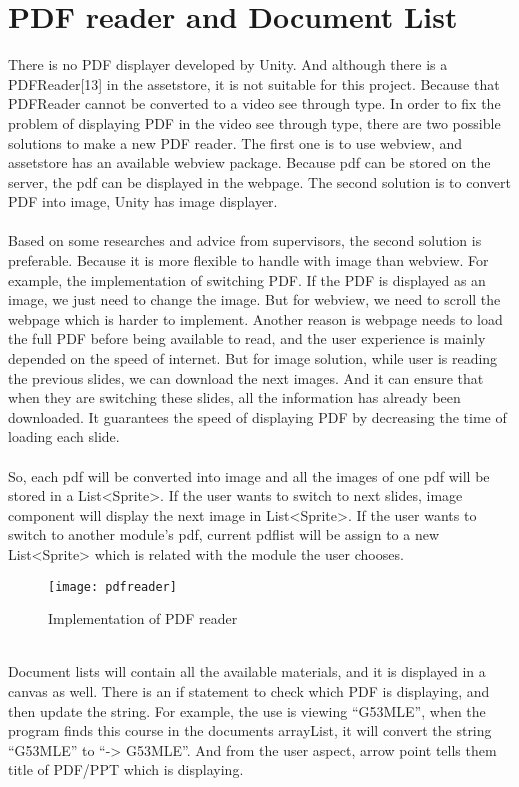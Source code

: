 \section{PDF reader and Document List}
There is no PDF displayer developed by Unity. And although there is a PDFReader[13] in the assetstore, it is not suitable for this project. Because that PDFReader cannot be converted to a video see through type. In order to fix the problem of displaying PDF in the video see through type, there are two possible solutions to make a new PDF reader. The first one is to use webview, and assetstore has an available webview package. Because pdf can be stored on the server, the pdf can be displayed in the webpage. The second solution is to convert PDF into image, Unity has image displayer. 
\\
\\
Based on some researches and advice from supervisors, the second solution is preferable. Because it is more flexible to handle with image than webview. For example, the implementation of switching PDF. If the PDF is displayed as an image, we just need to change the image. But for webview, we need to scroll the webpage which is harder to implement. Another reason is webpage needs to load the full PDF before being available to read, and the user experience is mainly depended on the speed of internet. But for image solution, while user is reading the previous slides, we can download the next images. And it can ensure that when they are switching these slides, all the information has already been downloaded. It guarantees the speed of displaying PDF by decreasing the time of loading each slide. 
\\
\\
So, each pdf will be converted into image and all the images of one pdf will be stored in a List<Sprite>. If the user wants to switch to next slides, image component will display the next image in List<Sprite>. If the user wants to switch to another module’s pdf, current pdflist will be assign to a new List<Sprite> which is related with the module the user chooses. 
\\
\begin{figure}[h]
    \centering
    \texttt{[image: pdfreader]}
    \caption{Implementation of PDF reader}
    \label{fig:mesh1}
\end{figure}
\\
Document lists will contain all the available materials, and it is displayed in a canvas as well. There is an if statement to check which PDF is displaying, and then update the string. For example, the use is viewing “G53MLE”, when the program finds this course in the documents arrayList, it will convert the string “G53MLE” to “-> G53MLE”. And from the user aspect, arrow point tells them title of PDF/PPT which is displaying.



